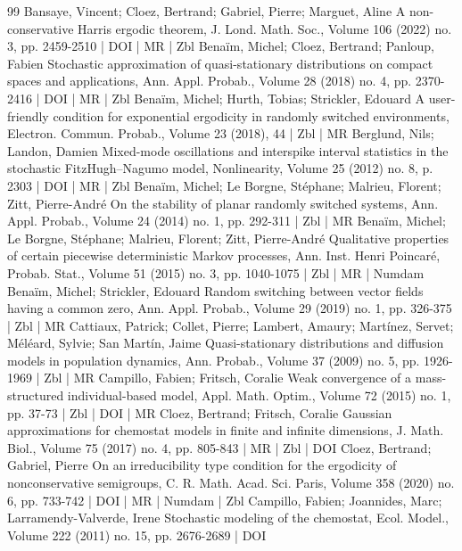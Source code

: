 \begin{thebibliography}{99}
 Bansaye, Vincent; Cloez, Bertrand; Gabriel, Pierre; Marguet, Aline A non-conservative Harris ergodic theorem, J. Lond. Math. Soc., Volume 106 (2022) no. 3, pp. 2459-2510 | DOI | MR | Zbl
 Benaïm, Michel; Cloez, Bertrand; Panloup, Fabien Stochastic approximation of quasi-stationary distributions on compact spaces and applications, Ann. Appl. Probab., Volume 28 (2018) no. 4, pp. 2370-2416 | DOI | MR | Zbl
 Benaïm, Michel; Hurth, Tobias; Strickler, Edouard A user-friendly condition for exponential ergodicity in randomly switched environments, Electron. Commun. Probab., Volume 23 (2018), 44 | Zbl | MR
 Berglund, Nils; Landon, Damien Mixed-mode oscillations and interspike interval statistics in the stochastic FitzHugh–Nagumo model, Nonlinearity, Volume 25 (2012) no. 8, p. 2303 | DOI | MR | Zbl
 Benaïm, Michel; Le Borgne, Stéphane; Malrieu, Florent; Zitt, Pierre-André On the stability of planar randomly switched systems, Ann. Appl. Probab., Volume 24 (2014) no. 1, pp. 292-311 | Zbl | MR
 Benaïm, Michel; Le Borgne, Stéphane; Malrieu, Florent; Zitt, Pierre-André Qualitative properties of certain piecewise deterministic Markov processes, Ann. Inst. Henri Poincaré, Probab. Stat., Volume 51 (2015) no. 3, pp. 1040-1075 | Zbl | MR | Numdam
 Benaïm, Michel; Strickler, Edouard Random switching between vector fields having a common zero, Ann. Appl. Probab., Volume 29 (2019) no. 1, pp. 326-375 | Zbl | MR
 Cattiaux, Patrick; Collet, Pierre; Lambert, Amaury; Martínez, Servet; Méléard, Sylvie; San Martín, Jaime Quasi-stationary distributions and diffusion models in population dynamics, Ann. Probab., Volume 37 (2009) no. 5, pp. 1926-1969 | Zbl | MR
 Campillo, Fabien; Fritsch, Coralie Weak convergence of a mass-structured individual-based model, Appl. Math. Optim., Volume 72 (2015) no. 1, pp. 37-73 | Zbl | DOI | MR
 Cloez, Bertrand; Fritsch, Coralie Gaussian approximations for chemostat models in finite and infinite dimensions, J. Math. Biol., Volume 75 (2017) no. 4, pp. 805-843 | MR | Zbl | DOI
 Cloez, Bertrand; Gabriel, Pierre On an irreducibility type condition for the ergodicity of nonconservative semigroups, C. R. Math. Acad. Sci. Paris, Volume 358 (2020) no. 6, pp. 733-742 | DOI | MR | Numdam | Zbl
 Campillo, Fabien; Joannides, Marc; Larramendy-Valverde, Irene Stochastic modeling of the chemostat, Ecol. Model., Volume 222 (2011) no. 15, pp. 2676-2689 | DOI

\end{thebibliography}
